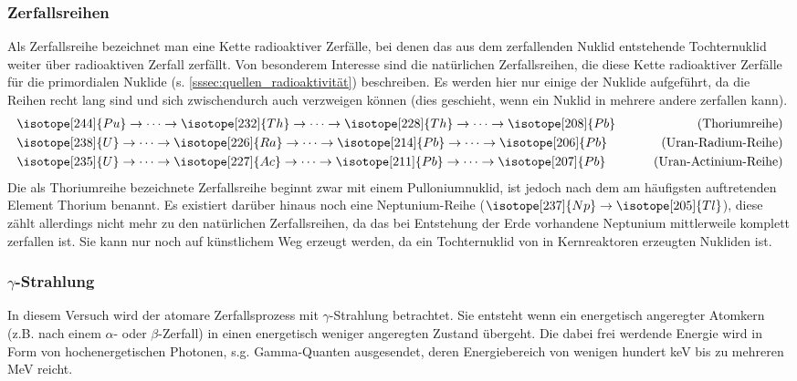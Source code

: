 \documentclass[11pt, a4paper]{article}
\numberwithin{equation}{section}
\begin{document}
\subsubsection{Zerfallsreihen}

Als Zerfallsreihe bezeichnet man eine Kette radioaktiver Zerfälle, bei denen das aus dem zerfallenden Nuklid entstehende Tochternuklid weiter über radioaktiven Zerfall zerfällt.
Von besonderem Interesse sind die natürlichen Zerfallsreihen, die diese Kette radioaktiver Zerfälle für die primordialen Nuklide (s. \ref{sssec:quellen_radioaktivität}) beschreiben.
Es werden hier nur einige der Nuklide aufgeführt, da die Reihen recht lang sind und sich zwischendurch auch verzweigen können (dies geschieht, wenn ein Nuklid in mehrere andere zerfallen kann).
\begin{align*}
	&\isotope[244]{Pu}\to\dots\to\isotope[232]{Th}\to\dots\to\isotope[228]{Th}\to\dots\to\isotope[208]{Pb} &\qquad\text{(Thoriumreihe)}\\
	&\isotope[238]{U}\to\dots\to\isotope[226]{Ra}\to\dots\to\isotope[214]{Pb}\to\dots\to\isotope[206]{Pb} &\qquad\text{(Uran-Radium-Reihe)}\\
	&\isotope[235]{U}\to\dots\to\isotope[227]{Ac}\to\dots\to\isotope[211]{Pb}\to\dots\to\isotope[207]{Pb} &\qquad\text{(Uran-Actinium-Reihe)}
\end{align*}
Die als Thoriumreihe bezeichnete Zerfallsreihe beginnt zwar mit einem Pulloniumnuklid, ist jedoch nach dem am häufigsten auftretenden Element Thorium benannt.
Es existiert darüber hinaus noch eine Neptunium-Reihe ($\isotope[237]{Np}\to\isotope[205]{Tl}$), diese zählt allerdings nicht mehr zu den natürlichen Zerfallsreihen, da das bei Entstehung der Erde vorhandene Neptunium mittlerweile komplett zerfallen ist.
Sie kann nur noch auf künstlichem Weg erzeugt werden, da  ein Tochternuklid von in Kernreaktoren erzeugten Nukliden ist.

\subsubsection{$\gamma$-Strahlung}

In diesem Versuch wird der atomare Zerfallsprozess mit $\gamma$-Strahlung betrachtet.
Sie entsteht wenn ein energetisch angeregter Atomkern (z.B. nach einem $\alpha$- oder $\beta$-Zerfall) in einen energetisch weniger angeregten Zustand übergeht.
Die dabei frei werdende Energie wird in Form von hochenergetischen Photonen, s.g. Gamma-Quanten ausgesendet, deren Energiebereich von wenigen hundert \si{\kilo\electronvolt} bis zu mehreren \si{\mega\electronvolt} reicht.
\end{document}
